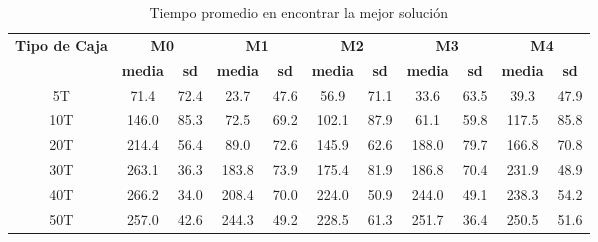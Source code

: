 \begin{table}[H]
    \centering
    \caption{Tiempo promedio en encontrar la mejor solución}
    \label{tab:tiempo}
    \begin{tabular}{|c|c|c|c|c|c|c|c|c|c|c|}
        \hline
        \multirow{2}{*}{\textbf{Tipo de Caja}} & \multicolumn{2}{c|}{\textbf{M0}} & \multicolumn{2}{c|}{\textbf{M1}} & \multicolumn{2}{c|}{\textbf{M2}} & \multicolumn{2}{c|}{\textbf{M3}} & \multicolumn{2}{c|}{\textbf{M4}}                                                                             \\ \cline{2-11}
                                               & \textbf{media}                   & \textbf{sd}                      & \textbf{media}                   & \textbf{sd}                      & \textbf{media}                   & \textbf{sd} & \textbf{media} & \textbf{sd} & \textbf{media} & \textbf{sd} \\ \hline
        5T                                     & 71.4                             & 72.4                             & 23.7                             & 47.6                             & 56.9                             & 71.1        & 33.6           & 63.5        & 39.3           & 47.9        \\ \hline
        10T                                    & 146.0                            & 85.3                             & 72.5                             & 69.2                             & 102.1                            & 87.9        & 61.1           & 59.8        & 117.5          & 85.8        \\ \hline
        20T                                    & 214.4                            & 56.4                             & 89.0                             & 72.6                             & 145.9                            & 62.6        & 188.0          & 79.7        & 166.8          & 70.8        \\ \hline
        30T                                    & 263.1                            & 36.3                             & 183.8                            & 73.9                             & 175.4                            & 81.9        & 186.8          & 70.4        & 231.9          & 48.9        \\ \hline
        40T                                    & 266.2                            & 34.0                             & 208.4                            & 70.0                             & 224.0                            & 50.9        & 244.0          & 49.1        & 238.3          & 54.2        \\ \hline
        50T                                    & 257.0                            & 42.6                             & 244.3                            & 49.2                             & 228.5                            & 61.3        & 251.7          & 36.4        & 250.5          & 51.6        \\ \hline
    \end{tabular}
\end{table}

